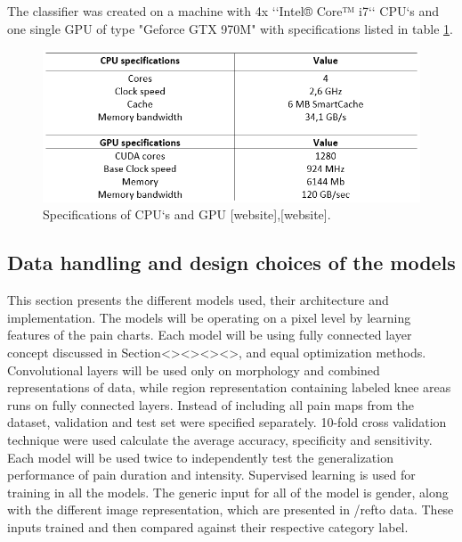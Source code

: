 \noindent
The classifier was created on a machine with 4x ‘‘Intel® Core™ i7‘‘ CPU‘s and one single GPU of type "Geforce GTX 970M" with specifications listed in table \ref{fig:Specs}.

\begin{figure} [H]
\centering
\includegraphics[width=1\textwidth]{figures/Specs}
\caption{Specifications of CPU‘s and GPU [website],[website].}
\label{fig:Specs}
\end{figure}

\subsection{Data handling and design choices of the models}
This section presents the different models used, their architecture and implementation.
The models will be operating on a pixel level by learning features of the pain charts.
Each model will be using fully connected layer concept discussed in Section<><><><>, and equal optimization methods. Convolutional layers will be used only on morphology and combined representations of data, while region representation containing labeled knee areas runs on fully connected layers.
Instead of including all pain maps from the dataset, validation and test set were specified separately. 10-fold cross validation technique were used calculate the average accuracy, specificity and sensitivity. Each model will be used twice to independently test the generalization performance of pain duration and intensity. Supervised learning is used for training in all the models. The generic input for all of the model is gender, along with the different image representation, which are presented in /ref{to data}. These inputs trained and then compared against their respective category label. 


